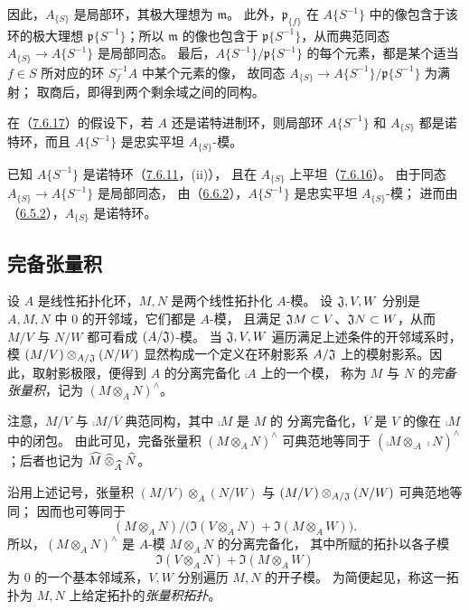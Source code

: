 因此，$A_{\{S\}}$ 是局部环，其极大理想为 $\mathfrak m$。
此外，$\mathfrak p_{\{f\}}$ 在 $A\{S^{-1}\}$ 中的像包含于该环的极大理想
$\mathfrak p\{S^{-1}\}$；所以 $\mathfrak m$ 的像也包含于
$\mathfrak p\{S^{-1}\}$，从而典范同态
$A_{\{S\}}\to A\{S^{-1}\}$ 是局部同态。
最后，$A\{S^{-1}\}/\mathfrak p\{S^{-1}\}$ 的每个元素，都是某个适当
$f\in S$ 所对应的环 $S_f^{-1}A$ 中某个元素的像，
故同态 $A_{\{S\}}\to A\{S^{-1}\}/\mathfrak p\{S^{-1}\}$ 为满射；
取商后，即得到两个剩余域之间的同构。

在（\hyperlink{para:0:7.6.17}{7.6.17}）的假设下，若 $A$ 还是诺特进制环，则局部环 $A\{S^{-1}\}$
和 $A_{\{S\}}$ 都是诺特环，而且 $A\{S^{-1}\}$ 是忠实平坦 $A_{\{S\}}$-模。

已知 $A\{S^{-1}\}$ 是诺特环（\hyperlink{para:0:7.6.11}{7.6.11}，(ii)），
且在 $A_{\{S\}}$ 上平坦（\hyperlink{para:0:7.6.16}{7.6.16}）。
由于同态 $A_{\{S\}}\to A\{S^{-1}\}$ 是局部同态，
由（\hyperlink{para:0:6.6.2}{6.6.2}），$A\{S^{-1}\}$ 是忠实平坦 $A_{\{S\}}$-模；
进而由（\hyperlink{para:0:6.5.2}{6.5.2}），$A_{\{S\}}$ 是诺特环。



\par

\subsection{完备张量积}\hypertarget{heading:0:7.7}{}

设 $A$ 是线性拓扑化环，$M,N$ 是两个线性拓扑化 $A$-模。
设 $\mathfrak J,V,W$ 分别是 $A,M,N$ 中 $0$ 的开邻域，它们都是 $A$-模，
且满足 $\mathfrak J M\subset V$、$\mathfrak J N\subset W$，从而 $M/V$ 与 $N/W$
都可看成 $(A/\mathfrak J)$-模。
当 $\mathfrak J,V,W$ 遍历满足上述条件的开邻域系时，模
$(M/V)\otimes_{A/\mathfrak J}(N/W)$ 显然构成一个定义在环射影系 $A/\mathfrak J$
上的模射影系。因此，取射影极限，便得到 $A$ 的分离完备化 $\comp A$ 上的一个模，
称为 $M$ 与 $N$ 的\emph{完备张量积}，记为 $(M\otimes_A N)^\wedge$。

注意，$M/V$ 与 $\comp M/\overline V$ 典范同构，其中 $\comp M$ 是 $M$ 的
分离完备化，$\overline V$ 是 $V$ 的像在 $\comp M$ 中的闭包。
由此可见，完备张量积 $(M\otimes_A N)^\wedge$ 可典范地等同于
$(\comp M\otimes_{\comp A}\comp N)^\wedge$；后者也记为
$\widehat{M}\mathbin{\widehat{\otimes}}_{\widehat{A}}\widehat{N}$。

沿用上述记号，张量积 $(M/V)\otimes_A(N/W)$ 与
$(M/V)\otimes_{A/\mathfrak J}(N/W)$ 可典范地等同；
因而也可等同于
\[
 (M\otimes_A N)\big/
 \bigl(\Im(V\otimes_A N)+\Im(M\otimes_A W)\bigr).
\]
所以，$(M\otimes_A N)^\wedge$ 是 $A$-模 $M\otimes_A N$ 的分离完备化，
其中所赋的拓扑以各子模
\[
 \Im(V\otimes_A N)+\Im(M\otimes_A W)
\]
为 $0$ 的一个基本邻域系，$V,W$ 分别遍历 $M,N$ 的开子模。
为简便起见，称这一拓扑为 $M,N$ 上给定拓扑的\emph{张量积拓扑}。


